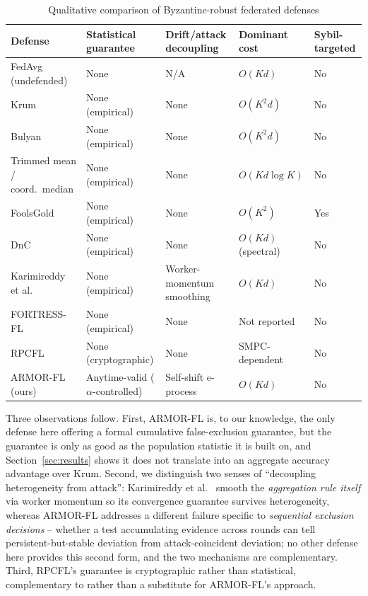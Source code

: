 \documentclass[pdflatex,iicol,sn-mathphys-num]{sn-jnl}%
\theoremstyle{thmstyleone}%
\theoremstyle{thmstyletwo}%
\theoremstyle{thmstylethree}%
\begin{document}
\begin{table}[htbp]
\centering
\caption{Qualitative comparison of Byzantine-robust federated defenses}\label{tab:qualcomp}
\footnotesize
\begin{tabularx}{\linewidth}{@{}XXXp{1.9cm}>{\centering\arraybackslash}p{1.6cm}@{}}
\toprule
Defense & Statistical guarantee & Drift/attack decoupling & Dominant cost & Sybil-targeted \\
\midrule
FedAvg (undefended) & None & N/A & $O(Kd)$ & No \\
Krum \citep{blanchard2017krum} & None (empirical) & None & $O(K^2d)$ & No \\
Bulyan \citep{mhamdi2018bulyan} & None (empirical) & None & $O(K^2d)$ & No \\
Trimmed mean / coord.\ median & None (empirical) & None & $O(Kd\log K)$ & No \\
FoolsGold \citep{fung2020foolsgold} & None (empirical) & None & $O(K^2)$ & Yes \\
DnC \citep{shejwalkar2021manipulating} & None (empirical) & None & $O(Kd)$ (spectral) & No \\
Karimireddy et al.\ \citep{karimireddy2021learning} & None (empirical) & Worker-momentum smoothing & $O(Kd)$ & No \\
FORTRESS-FL \citep{dang2026fortressfl} & None (empirical) & None & Not reported & No \\
RPCFL \citep{chen2026rpcfl} & None (cryptographic) & None & SMPC-dependent & No \\
ARMOR-FL (ours) & Anytime-valid ($\alpha$-controlled) & Self-shift e-process & $O(Kd)$ & No \\
\bottomrule
\end{tabularx}
\end{table}

Three observations follow. First, ARMOR-FL is, to our knowledge, the only defense here offering a formal cumulative false-exclusion guarantee, but the guarantee is only as good as the population statistic it is built on, and Section~\ref{sec:results} shows it does not translate into an aggregate accuracy advantage over Krum. Second, we distinguish two senses of ``decoupling heterogeneity from attack'': Karimireddy et al.\ \citep{karimireddy2021learning} smooth the \emph{aggregation rule itself} via worker momentum so its convergence guarantee survives heterogeneity, whereas ARMOR-FL addresses a different failure specific to \emph{sequential exclusion decisions} -- whether a test accumulating evidence across rounds can tell persistent-but-stable deviation from attack-coincident deviation; no other defense here provides this second form, and the two mechanisms are complementary. Third, RPCFL's guarantee is cryptographic rather than statistical, complementary to rather than a substitute for ARMOR-FL's approach.
\end{document}
